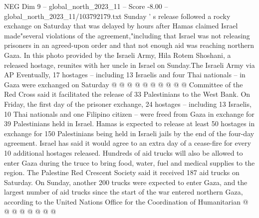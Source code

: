 \begin{textsample}{NEG Dim 9 – global\_north\_2023\_11 – Score -8.00 – global\_north\_2023\_11/103792179.txt}
Sunday ' s release followed a rocky exchange on Saturday that was delayed by hours after Hamas claimed Israel made"several violations of the agreement,"including that Israel was not releasing prisoners in an agreed-upon order and that not enough aid was reaching northern Gaza.
In this photo provided by the Israeli Army, Hila Rotem Shoshani, a released hostage, reunites with her uncle in Israel on Sunday.The Israeli Army via AP Eventually, 17 hostages -- including 13 Israelis and four Thai nationals -- in Gaza were exchanged on Saturday @ @ @ @ @ @ @ @ @ @ Committee of the Red Cross said it facilitated the release of 33 Palestinians to the West Bank.
On Friday, the first day of the prisoner exchange, 24 hostages -- including 13 Israelis, 10 Thai nationals and one Filipino citizen -- were freed from Gaza in exchange for 39 Palestinians held in Israel.
Hamas is expected to release at least 50 hostages in exchange for 150 Palestinians being held in Israeli jails by the end of the four-day agreement.
Israel has said it would agree to an extra day of a cease-fire for every 10 additional hostages released.
Hundreds of aid trucks will also be allowed to enter Gaza during the truce to bring food, water, fuel and medical supplies to the region.
The Palestine Red Crescent Society said it received 187 aid trucks on Saturday.
On Sunday, another 200 trucks were expected to enter Gaza, and the largest number of aid trucks since the start of the war entered northern Gaza, according to the United Nations Office for the Coordination of Humanitarian @ @ @ @ @ @ @ @

\end{textsample}
